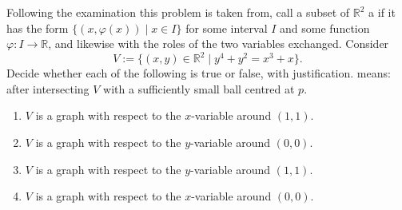 \begin{exercise}
\label{ex:graph_over_which_variable}
Following the examination this problem is taken from, call a subset of $\mathbb{R}^2$ a
 if it has the form $\{(x,\varphi(x)) \mid x \in
I\}$ for some interval $I$ and some function $\varphi : I \to \mathbb{R}$, and likewise with the
roles of the two variables exchanged. Consider
\[V := \{(x,y) \in \mathbb{R}^2 \mid y^4+y^2 = x^3+x\}.\]
Decide whether each of the following is true or false, with justification.  means:
after intersecting $V$ with a sufficiently small ball centred at $p$.
\begin{enumerate}[label=\textbf{(\alph*)}]
  \item $V$ is a graph with respect to the $x$-variable around $(1,1)$.
  \item $V$ is a graph with respect to the $y$-variable around $(0,0)$.
  \item $V$ is a graph with respect to the $y$-variable around $(1,1)$.
  \item $V$ is a graph with respect to the $x$-variable around $(0,0)$.
\end{enumerate}
\end{exercise}

